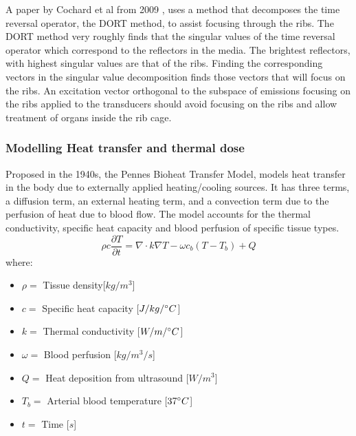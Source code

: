 \documentclass[11pt]{article} %
\begin{document}
\begin{itemize}
		A paper by Cochard et al from 2009 \cite{Cochard2009}, uses a method that decomposes the time reversal operator, the DORT method, to assist focusing through the ribs. The DORT method very roughly finds that the singular values of the time reversal operator  which correspond to the reflectors in the media. The brightest reflectors, with highest singular values are that of the ribs. Finding the corresponding vectors in the singular value decomposition finds those vectors that will focus on the ribs. An excitation vector orthogonal to the subspace of emissions focusing on the ribs applied to the transducers should avoid focusing on the ribs and allow treatment of organs inside the rib cage. 
		
	
	\end{itemize}
	
		
		
	
	\subsubsection{Modelling Heat transfer and thermal dose}
	

	Proposed in the 1940s, the Pennes Bioheat Transfer Model, \cite{Pennes1948} models heat transfer in the body due to externally applied heating/cooling sources. It has three terms, a diffusion term, an external heating term, and a convection term due to the perfusion of heat due to blood flow. The model accounts for the thermal conductivity, specific heat capacity and blood perfusion of specific tissue types. 
	\begin{equation}
		\boxed{\rho c \frac{\partial T}{\partial t}= \nabla\cdot k \nabla T-\omega c_b (T-T_b)+Q}
	\end{equation}
	where:
	
	\begin{itemize}
		\item $ \rho = $ Tissue density[$ kg/m^3 $]
		\item  $ c= $ Specific heat capacity [$ J/kg/\degree C  $]
		\item $ k= $ Thermal conductivity  [$ W/m/\degree C $]
		\item $ \omega = $ Blood perfusion [$ kg/m^3/s $]
		\item $ Q= $ Heat deposition from ultrasound $ [W/m^3 $]
		\item $ T_b= $ Arterial blood temperature [$ 37\degree C $]
		\item $ t= $ Time [$ s $]
	\end{itemize}
	
\end{document}
